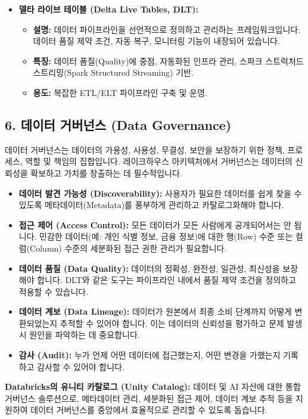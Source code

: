 \documentclass[11pt,a4paper]{article}
\theoremstyle{definition}
\begin{document}
\begin{tcolorbox}[title=\textbf{Databricks 데이터 수집 도구}, colback=lime!5!white, colframe=lime!75!black, sharp corners, boxrule=0.8pt]
\begin{itemize}
    \item \textbf{델타 라이브 테이블 (Delta Live Tables, DLT):}
    \begin{itemize}
        \item \textbf{설명:} 데이터 파이프라인을 선언적으로 정의하고 관리하는 프레임워크입니다. 데이터 품질 제약 조건, 자동 복구, 모니터링 기능이 내장되어 있습니다.
        \item \textbf{특징:} 데이터 품질(Quality)에 중점, 자동화된 인프라 관리, 스파크 스트럭처드 스트리밍(Spark Structured Streaming) 기반.
        \item \textbf{용도:} 복잡한 ETL/ELT 파이프라인 구축 및 운영.
    \end{itemize}
\end{itemize}
\end{tcolorbox}

\subsection*{6. 데이터 거버넌스 (Data Governance)}

데이터 거버넌스는 데이터의 가용성, 사용성, 무결성, 보안을 보장하기 위한 정책, 프로세스, 역할 및 책임의 집합입니다. 레이크하우스 아키텍처에서 거버넌스는 데이터의 신뢰성을 확보하고 가치를 창출하는 데 필수적입니다.

\begin{tcolorbox}[title=\textbf{데이터 거버넌스의 중요성}, colback=gray!5!white, colframe=gray!75!black, sharp corners, boxrule=0.8pt]
\begin{itemize}
    \item \textbf{데이터 발견 가능성 (Discoverability):} 사용자가 필요한 데이터를 쉽게 찾을 수 있도록 메타데이터(Metadata)를 풍부하게 관리하고 카탈로그화해야 합니다.
    \item \textbf{접근 제어 (Access Control):} 모든 데이터가 모든 사람에게 공개되어서는 안 됩니다. 민감한 데이터(예: 개인 식별 정보, 금융 정보)에 대한 행(Row) 수준 또는 컬럼(Column) 수준의 세분화된 접근 권한 관리가 필요합니다.
    \item \textbf{데이터 품질 (Data Quality):} 데이터의 정확성, 완전성, 일관성, 최신성을 보장해야 합니다. DLT와 같은 도구는 파이프라인 내에서 품질 제약 조건을 정의하고 적용할 수 있습니다.
    \item \textbf{데이터 계보 (Data Lineage):} 데이터가 원본에서 최종 소비 단계까지 어떻게 변환되었는지 추적할 수 있어야 합니다. 이는 데이터의 신뢰성을 평가하고 문제 발생 시 원인을 파악하는 데 중요합니다.
    \item \textbf{감사 (Audit):} 누가 언제 어떤 데이터에 접근했는지, 어떤 변경을 가했는지 기록하고 감사할 수 있어야 합니다.
\end{itemize}
\textbf{Databricks의 유니티 카탈로그 (Unity Catalog):} 데이터 및 AI 자산에 대한 통합 거버넌스 솔루션으로, 메타데이터 관리, 세분화된 접근 제어, 데이터 계보 추적 등을 지원하여 데이터 거버넌스를 중앙에서 효율적으로 관리할 수 있도록 돕습니다.
\end{tcolorbox}
\end{document}
